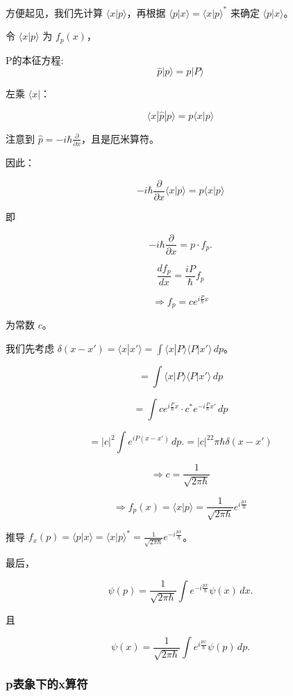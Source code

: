 \documentclass[lang=cn,15pt]{elegantbook}
\begin{document}
方便起见，我们先计算 $\langle x | p \rangle$，再根据 $\langle p | x \rangle = \langle x | p \rangle^*$ 来确定 $\langle p | x \rangle$。

令 $\langle x | p \rangle$ 为 $f_p(x)$，


P的本征方程:
\[
\hat{p} | p \rangle = p | P \rangle
\]

左乘 $\langle x |$：

\[
\langle x | \hat{p} | p \rangle = p \langle x | p \rangle
\]

注意到 $\hat{p} = -i\hbar \frac{\partial}{\partial x}$，且是厄米算符。

因此：

\[
-i\hbar \frac{\partial}{\partial x} \langle x | p \rangle = p \langle x | p \rangle
\]

即 

\[
-i\hbar \frac{\partial}{\partial x}= p \cdot f_p.
\]

\[
\frac{df_p}{dx} = \frac{iP}{\hbar} f_p
\]

\[
\Rightarrow f_p = c e^{i \frac{P}{\hbar} x}
\]

为常数 $c$。

我们先考虑 $\delta(x - x') = \langle x | x' \rangle = \int \langle x | P \rangle \langle P | x' \rangle \, dp$。

\[
= \int \langle x | P \rangle \langle P | x' \rangle \, dp
\]

\[
= \int c e^{i \frac{P}{\hbar} x} \cdot c^* e^{-i \frac{P}{\hbar} x'} \, dp
\]

\[
= |c|^2 \int e^{i P (x - x')} \, dp.=|c|^22\pi\hbar\delta(x-x')
\]

\[
\Rightarrow c = \frac{1}{\sqrt{2\pi \hbar}}
\]

\[
\Rightarrow f_p(x) = \langle x | p \rangle = \frac{1}{\sqrt{2\pi \hbar}} e^{i \frac{p x}{\hbar}}
\]

推导 $f_x(p) = \langle p | x \rangle = \langle x | p \rangle^* = \frac{1}{\sqrt{2\pi \hbar}} e^{-i \frac{p x}{\hbar}}$。

最后，

\[
\psi(p) = \frac{1}{\sqrt{2\pi \hbar}} \int e^{-i \frac{p x}{\hbar}} \psi(x) \, dx.
\]

且

\[
\psi(x) = \frac{1}{\sqrt{2\pi \hbar}} \int e^{i \frac{p x}{\hbar}} \psi(p) \, dp.
\]

\subsubsection{p表象下的x算符}
\end{document}
